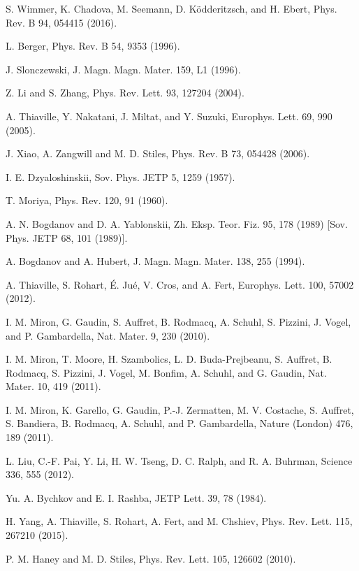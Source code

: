 \documentclass[12pt]{iopart}
\begin{document}
\begin{thebibliography}{99}
S. Wimmer, K. Chadova, M. Seemann, D. K\"{o}dderitzsch, and H. Ebert, Phys. Rev. B 94, 054415 (2016).

L. Berger, Phys. Rev. B 54, 9353 (1996).

J. Slonczewski, J. Magn. Magn. Mater. 159, L1 (1996).

Z. Li and S. Zhang, Phys. Rev. Lett. 93, 127204 (2004).

A. Thiaville, Y. Nakatani, J. Miltat, and Y. Suzuki, Europhys. Lett. 69, 990 (2005).

J. Xiao, A. Zangwill and M. D. Stiles, Phys. Rev. B 73, 054428 (2006).

I. E. Dzyaloshinskii, Sov. Phys. JETP 5, 1259 (1957).

T. Moriya, Phys. Rev. 120, 91 (1960).

A. N. Bogdanov and D. A. Yablonskii, Zh. Eksp. Teor. Fiz. 95, 178 (1989) [Sov. Phys. JETP 68, 101 (1989)].

A. Bogdanov and A. Hubert, J. Magn. Magn. Mater. 138, 255 (1994).

A. Thiaville, S. Rohart, \'{E}. Ju\'{e}, V. Cros, and A. Fert, Europhys. Lett. 100, 57002 (2012).

I. M. Miron, G. Gaudin, S. Auffret, B. Rodmacq, A. Schuhl, S. Pizzini, J. Vogel, and P. Gambardella, Nat. Mater. 9, 230 (2010).

I. M. Miron, T. Moore, H. Szambolics, L. D. Buda-Prejbeanu, S. Auffret, B. Rodmacq, S. Pizzini, J. Vogel, M. Bonfim, A. Schuhl, and G. Gaudin, Nat. Mater. 10, 419 (2011).

I. M. Miron, K. Garello, G. Gaudin, P.-J. Zermatten, M. V. Costache, S. Auffret, S. Bandiera, B. Rodmacq, A. Schuhl, and P. Gambardella, Nature (London) 476, 189 (2011).

L. Liu, C.-F. Pai, Y. Li, H. W. Tseng, D. C. Ralph, and R. A. Buhrman, Science 336, 555 (2012).

Yu. A. Bychkov and E. I. Rashba, JETP Lett. 39, 78 (1984).

H. Yang, A. Thiaville, S. Rohart, A. Fert, and M. Chshiev, Phys. Rev. Lett. 115, 267210 (2015).

P. M. Haney and M. D. Stiles, Phys. Rev. Lett. 105, 126602 (2010).


\end{thebibliography}
\end{document}
